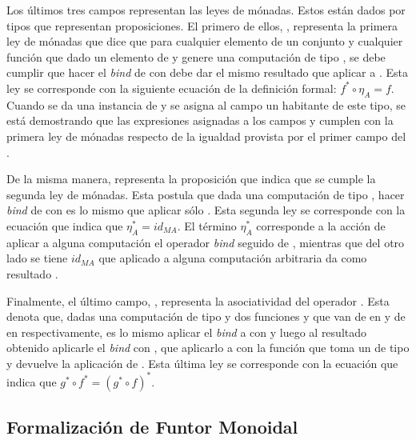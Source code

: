 Los últimos tres campos representan las leyes de mónadas. Estos están dados por tipos que representan proposiciones. El primero de ellos, , representa la primera ley de mónadas que dice que para cualquier elemento  de un conjunto  y cualquier función  que dado un elemento de  y genere una computación de tipo , se debe cumplir que hacer el \textit{bind} de   con  debe dar el mismo resultado que aplicar  a . Esta ley se corresponde con la siguiente ecuación de la definición formal: $f^* \circ \eta_A = f$. Cuando se da una instancia de  y se asigna al campo  un habitante de este tipo, se está demostrando que las expresiones asignadas a los campos  y \AgdaField{$\_\gg=\_$} cumplen con la primera ley de mónadas respecto de la igualdad provista por el primer campo del .

De la misma manera,  representa la proposición que indica que se cumple la segunda ley de mónadas. Esta postula que dada una computación  de tipo , hacer \textit{bind} de  con  es lo mismo que aplicar sólo . Esta segunda ley se corresponde con la ecuación que indica que $\eta_A^* = id_{M A}$. El término $\eta_A^*$ corresponde a la acción de aplicar a alguna computación  el operador \textit{bind} seguido de , mientras que del otro lado se tiene $id_{M A}$ que aplicado a alguna computación arbitraria  da como resultado .

Finalmente, el último campo, , representa la asociatividad del operador \hbox{\AgdaField{$\_\gg=\_$}}. Esta denota que, dadas una computación  de tipo  y dos funciones  y  que van de  en \hbox{} y de  en  respectivamente, es lo mismo aplicar el \textit{bind} a  con  y luego al resultado obtenido aplicarle el \textit{bind} con , que aplicarlo a  con la función que toma un  de tipo  y devuelve la aplicación de  \AgdaField{$\gg=$} . Esta última ley se corresponde con la ecuación que indica que $g^* \circ f^* = (g^* \circ f)^*$. 

\subsection{Formalización de Funtor Monoidal}\label{funtmon:funt}

